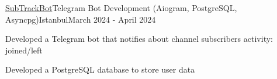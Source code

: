  \begin{resume_employer}{\href{https://t.me/subscriber_tracker_bot}{SubTrackBot}}{Telegram Bot Development (Aiogram, PostgreSQL, Asyncpg)}{Istanbul}{March 2024 - April 2024}
 \item Developed a Telegram bot that notifies about channel subscribers activity: joined/left
 \item Developed a PostgreSQL database to store user data
 \end{resume_employer}
